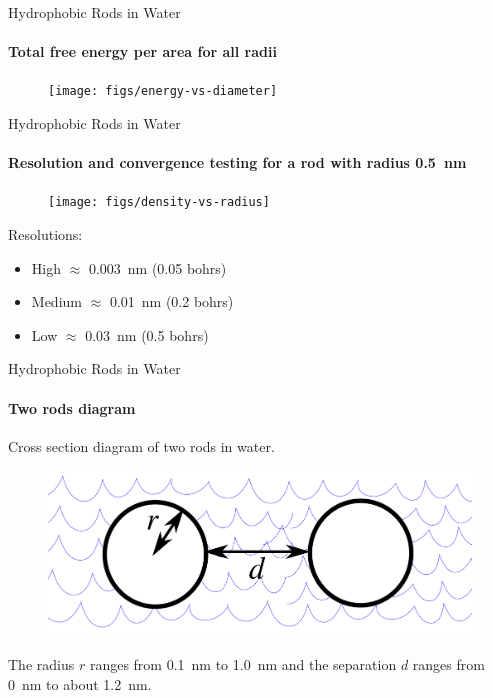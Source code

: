 \documentclass{beamer}
\begin{document}
\begin{frame}[fragile]{Hydrophobic Rods in Water}
\framesubtitle{Total free energy per area for all radii}
\begin{figure}
\begin{center}
\texttt{[image: figs/energy-vs-diameter]}
\end{center}
\end{figure} 
\end{frame}

\begin{frame}[fragile]{Hydrophobic Rods in Water}
\framesubtitle{Resolution and convergence testing for a rod with radius 0.5~nm}
\begin{figure}
\begin{center}
\texttt{[image: figs/density-vs-radius]}
\end{center}
\end{figure} 
\footnotesize{Resolutions:}
\begin{itemize}
 \item \footnotesize{High $\approx$ 0.003~nm (0.05 bohrs)}
 \item \footnotesize{Medium $\approx$ 0.01~nm (0.2 bohrs)}
 \item \footnotesize{Low $\approx$ 0.03~nm (0.5 bohrs)}
\end{itemize}
\end{frame}

\begin{frame}[fragile]{Hydrophobic Rods in Water}
\framesubtitle{Two rods diagram}
Cross section diagram of two rods in water.
\begin{figure}
\begin{center}
\includegraphics[width=\columnwidth]{figs/rods-diagram}
\end{center}
\end{figure}
The radius $r$ ranges from 0.1~nm to 1.0~nm and the separation
$d$ ranges from 0~nm to about 1.2~nm.
\end{frame}
\end{document}
